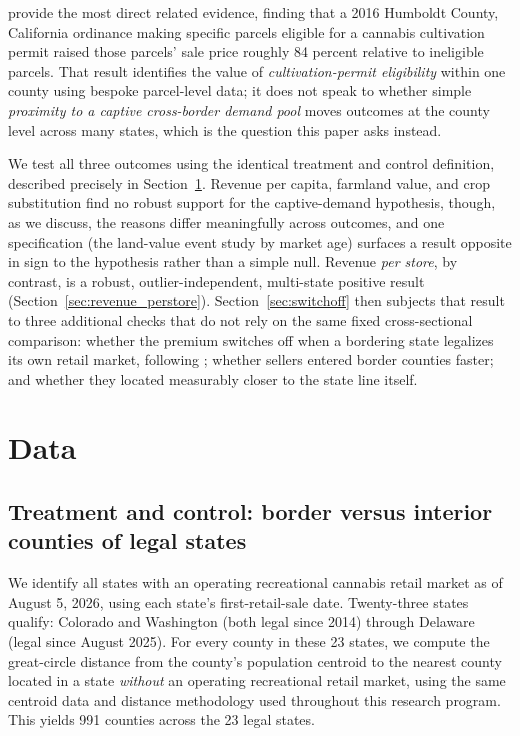 ﻿\documentclass{article}
\begin{document}
\citet{SchwabButsic2020} provide the most direct related evidence, finding that a 2016 Humboldt County,
California ordinance making specific parcels eligible for a cannabis cultivation permit raised those
parcels' sale price roughly 84 percent relative to ineligible parcels. That result identifies the value of
\emph{cultivation-permit eligibility} within one county using bespoke parcel-level data; it does not speak
to whether simple \emph{proximity to a captive cross-border demand pool} moves outcomes at the county
level across many states, which is the question this paper asks instead.

We test all three outcomes using the identical treatment and control definition, described precisely in
Section~\ref{sec:data}. Revenue per capita, farmland value, and crop substitution find no robust support
for the captive-demand hypothesis, though, as we discuss, the reasons differ meaningfully across outcomes,
and one specification (the land-value event study by market age) surfaces a result opposite in sign to the
hypothesis rather than a simple null. Revenue \emph{per store}, by contrast, is a robust, outlier-independent,
multi-state positive result (Section~\ref{sec:revenue_perstore}). Section~\ref{sec:switchoff} then subjects
that result to three additional checks that do not rely on the same fixed cross-sectional comparison:
whether the premium switches off when a bordering state legalizes its own retail market, following
\citet{HansenMillerWeber2020}; whether sellers entered border counties faster; and whether they located
measurably closer to the state line itself.

\section{Data}
\label{sec:data}

\subsection{Treatment and control: border versus interior counties of legal states}

We identify all states with an operating recreational cannabis retail market as of August 5, 2026, using
each state's first-retail-sale date. Twenty-three states qualify: Colorado and Washington (both legal
since 2014) through Delaware (legal since August 2025). For every county in these 23 states, we compute
the great-circle distance from the county's population centroid to the nearest county located in a state
\emph{without} an operating recreational retail market, using the same centroid data and distance
methodology used throughout this research program. This yields 991 counties across the 23 legal states.
\end{document}
